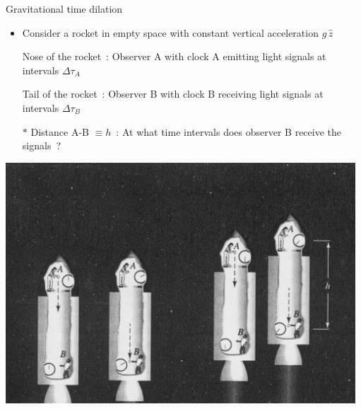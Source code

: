\onecolumn
\begin{center}
{\blue Gravitational time dilation}
\end{center}
\begin{itemize}
\item Consider a rocket in empty space with constant vertical acceleration $g\,\hat{z}$
\item[] Nose of the rocket~: Observer A with clock A emitting light signals at intervals $\Delta\tau_{A}$
\item[] Tail of the rocket~: Observer B with clock B receiving light signals at intervals $\Delta\tau_{B}$
\item[$\ast$] Distance A-B $\equiv h$~: {\red At what time intervals does observer B receive the signals~?}
\end{itemize}
%
\begin{center}
\includegraphics[keepaspectratio,height=9cm]{clocks}
\end{center}


